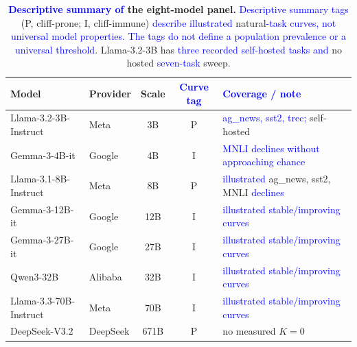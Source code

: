 \documentclass[11pt]{article}
\begin{document}
\begin{table}[h]
\centering
\caption{\textbf{\textcolor{blue}{Descriptive summary of} the eight-model panel.} \textcolor{blue}{Descriptive summary tags}
(P, cliff-prone; I, cliff-immune) \textcolor{blue}{describe illustrated} natural\textcolor{blue}{-task curves, not universal
model properties. The tags do not define a population prevalence or a universal threshold}.
Llama-3.2-3B has \textcolor{blue}{three recorded self-hosted tasks and} no hosted \textcolor{blue}{seven-task} sweep\textcolor{blue}{.}}
\label{stab:grid}
\footnotesize
\begin{tabular}{llccl}
\toprule
Model & Provider & Scale & \textcolor{blue}{Curve tag} & \textcolor{blue}{Coverage / note} \\
\midrule
Llama-3.2-3B-Instruct   & Meta     & 3B    & P & \textcolor{blue}{ag\_}\textcolor{blue}{news, sst2, trec;} self-hosted \\
Gemma-3-4B-it           & Google   & 4B    & I & \textcolor{blue}{MNLI declines without approaching chance} \\
Llama-3.1-8B-Instruct   & Meta     & 8B    & P & \textcolor{blue}{illustrated} ag\_news, sst2, MNLI \textcolor{blue}{declines} \\
Gemma-3-12B-it          & Google   & 12B   & I & \textcolor{blue}{illustrated stable/improving curves} \\
Gemma-3-27B-it          & Google   & 27B   & I & \textcolor{blue}{illustrated stable/improving curves} \\
Qwen3-32B               & Alibaba  & 32B   & I & \textcolor{blue}{illustrated stable/improving curves} \\
Llama-3.3-70B-Instruct  & Meta     & 70B   & I & \textcolor{blue}{illustrated stable/improving curves} \\
DeepSeek-V3.2           & DeepSeek & 671B  & P & no measured $K{=}0$ \\
\bottomrule
\end{tabular}
\end{table}
\end{document}
